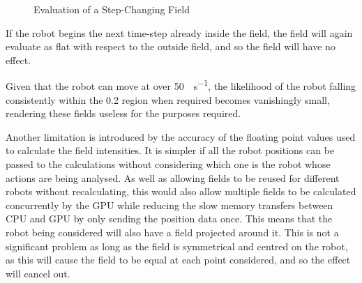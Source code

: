 \documentclass[10pt]{article}
\begin{document}
\begin{figure}
  \caption{Evaluation of a Step-Changing Field}
\end{figure}

If the robot begins the next time-step already inside the field, the field will
again evaluate as flat with respect to the outside field, and so the field will
have no effect.

Given that the robot can move at over \SI{50}{\inch\per\second}, the likelihood
of the robot falling consistently within the \SI{0.2}{\inch} region when
required becomes vanishingly small, rendering these fields useless for the
purposes required.

Another limitation is introduced by the accuracy of the floating point values
used to calculate the field intensities.  It is simpler if all the robot
positions can be passed to the calculations without considering which one is the
robot whose actions are being analysed.  As well as allowing fields to be reused
for different robots without recalculating, this would also allow multiple
fields to be calculated concurrently by the GPU while reducing the slow memory
transfers between CPU and GPU by only sending the position data once. This means
that the robot being considered will also have a field projected around it. 
This is not a significant problem as long as the field is symmetrical and
centred on the robot, as this will cause the field to be equal at each point
considered, and so the effect will cancel out.
\end{document}
